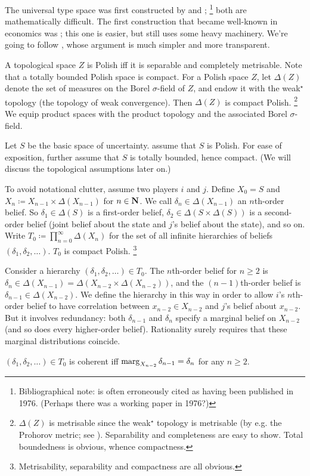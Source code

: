 \documentclass[11pt,letterpaper,reqno,oneside]{article}
\begin{document}
The universal type space was first constructed by \textcite{ArmbrusterBoge1979} and \textcite{BogeEisele1979};%
	\footnote{Bibliographical note: \textcite{ArmbrusterBoge1979} is often erroneously cited as having been published in 1976. (Perhaps there was a working paper in 1976?)}
both are mathematically difficult. The first construction that became well-known in economics was \textcite{MertensZamir1985}; this one is easier, but still uses some heavy machinery. We're going to follow \textcite{BrandenburgerDekel1993}, whose argument is much simpler and more transparent.

A topological space $Z$ is Polish iff it is separable and completely metrisable. Note that a totally bounded Polish space is compact. For a Polish space $Z$, let $\Delta(Z)$ denote the set of measures on the Borel $\sigma$-field of $Z$, and endow it with the weak$^\star$ topology (the topology of weak convergence). Then $\Delta(Z)$ is compact Polish.%
	\footnote{$\Delta(Z)$ is metrisable since the weak$^\star$ topology is metrisable (by e.g. the Prohorov metric; see \textcite[][pp. 72--3]{Billingsley1999}). Separability and completeness are easy to show. Total boundedness is obvious, whence compactness.}
We equip product spaces with the product topology and the associated Borel $\sigma$-field.

Let $S$ be the basic space of uncertainty. \textcite{BrandenburgerDekel1993} assume that $S$ is Polish. For ease of exposition, further assume that $S$ is totally bounded, hence compact. (We will discuss the topological assumptions later on.)

To avoid notational clutter, assume two players $i$ and $j$. Define $X_0=S$ and $X_n \coloneqq X_{n-1} \times \Delta(X_{n-1})$ for $n \in \mathbf{N}$. We call $\delta_n \in \Delta(X_{n-1})$ an $n$th-order belief. So $\delta_1 \in \Delta(S)$ is a first-order belief, $\delta_2 \in \Delta( S \times \Delta(S) )$ is a second-order belief (joint belief about the state and $j$'s belief about the state), and so on. Write $T_0 \coloneqq \prod_{n=0}^\infty \Delta(X_n)$ for the set of all infinite hierarchies of beliefs $(\delta_1,\delta_2,\dots)$. $T_0$ is compact Polish.%
	\footnote{Metrisability, separability and compactness are all obvious.}

Consider a hierarchy $(\delta_1,\delta_2,\dots) \in T_0$. The $n$th-order belief for $n \geq 2$ is $\delta_n \in \Delta( X_{n-1} ) = \Delta( X_{n-2} \times \Delta(X_{n-2}) )$, and the $(n-1)$th-order belief is $\delta_{n-1} \in \Delta( X_{n-2} )$. We define the hierarchy in this way in order to allow $i$'s $n$th-order belief to have correlation between $x_{n-2} \in X_{n-2}$ and $j$'s belief about $x_{n-2}$. But it involves redundancy: both $\delta_{n-1}$ and $\delta_n$ specify a marginal belief on $X_{n-2}$ (and so does every higher-order belief). Rationality surely requires that these marginal distributions coincide.
%
\begin{definition}
	$(\delta_1,\delta_2,\dots) \in T_0$ is coherent iff $\operatorname*{marg}_{X_{n-2}} \delta_{n-1} = \delta_n$ for any $n \geq 2$.
\end{definition}
\end{document}
